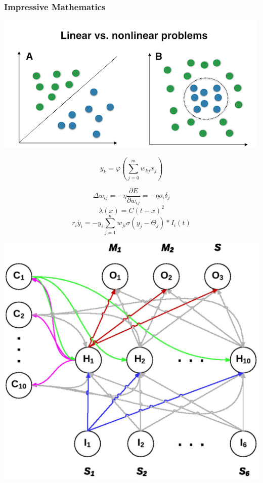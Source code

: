 \documentclass[aspectratio=169,x11names]{beamer}
\begin{document}
\begin{frame}[fragile]
\frametitle{Impressive Mathematics}

\begin{minipage}{0.52\textwidth}
\begin{center}
\includegraphics[scale=0.3]{images/linear_nonlinear.png} 
\end{center}
\end{minipage}\begin{minipage}{0.35\textwidth}
$$y_k = \varphi\left(\sum_{j=0}^m w_{kj}x_j\right)$$
\end{minipage}

\small
\begin{minipage}{0.47\textwidth}
$$\Delta w_{ij}=-\eta \frac{\partial E}{\partial w_{ij}} = -\eta o_i \delta_j$$
$$\lambda(x) = C(t-x)^2$$
$$r_i \dot{y_i} = -y_i \sum_{j=1}^n w_{ji}\sigma\left(y_j - \Theta_j\right) * I_i(t)$$
\end{minipage}\begin{minipage}{0.47\textwidth}
\begin{center}
\includegraphics[scale=0.35]{images/recursive.jpg} 
\end{center}
\end{minipage}
\end{frame}
\end{document}
